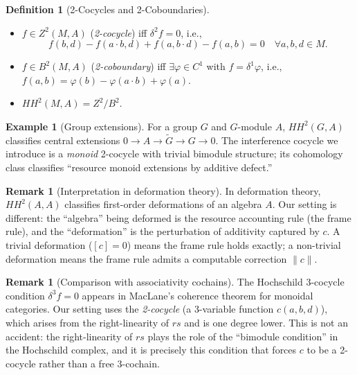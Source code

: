 \documentclass[acmsmall,sigplan,anonymous,review,screen]{acmart}
\theoremstyle{plain}
\theoremstyle{definition}
\newtheorem{definition}[theorem]{Definition}
\newtheorem{example}[theorem]{Example}
\newtheorem{remark}[theorem]{Remark}
\newcommand{\rs}{\mathit{rs}}
\newcommand{\HH}[2]{H\!H^{#1}(#2)}
\newcommand{\norm}[1]{\|#1\|}
\begin{document}
\begin{definition}[2-Cocycles and 2-Coboundaries]
\label{def:2cocycle}
  \begin{itemize}[itemsep=2pt]
    \item $f \in Z^2(M, A)$ (\emph{2-cocycle}) iff $\delta^2 f = 0$, i.e.,
      \[
        f(b, d) - f(a \cdot b, d) + f(a, b \cdot d) - f(a, b) = 0
        \quad \forall a, b, d \in M.
      \]
    \item $f \in B^2(M, A)$ (\emph{2-coboundary}) iff $\exists \varphi \in C^1$
      with $f = \delta^1 \varphi$, i.e., $f(a, b) = \varphi(b) - \varphi(a \cdot b) + \varphi(a)$.
    \item $\HH{2}{M, A} = Z^2 / B^2$.
  \end{itemize}
\end{definition}

\begin{example}[Group extensions]
  For a group $G$ and $G$-module $A$, $\HH{2}{G, A}$ classifies
  central extensions $0 \to A \to \tilde{G} \to G \to 0$.  The
  interference cocycle we introduce is a \emph{monoid} 2-cocycle with
  trivial bimodule structure; its cohomology class classifies
  ``resource monoid extensions by additive defect.''
\end{example}

\begin{remark}[Interpretation in deformation theory]
  In deformation theory, $\HH{2}{A, A}$ classifies first-order
  deformations of an algebra $A$.  Our setting is different: the
  ``algebra'' being deformed is the resource accounting rule (the frame
  rule), and the ``deformation'' is the perturbation of additivity
  captured by $c$.  A trivial deformation ($[c] = 0$) means the frame
  rule holds exactly; a non-trivial deformation means the frame rule
  admits a computable correction $\norm{c}$.
\end{remark}

\begin{remark}[Comparison with associativity cochains]
  The Hochschild 3-cocycle condition $\delta^3 f = 0$ appears in
  MacLane's coherence theorem for monoidal categories.  Our setting uses
  the \emph{2-cocycle} (a 3-variable function $c(a,b,d)$), which arises
  from the right-linearity of $\rs$ and is one degree lower.  This is
  not an accident: the right-linearity of $\rs$ plays the role of the
  ``bimodule condition'' in the Hochschild complex, and it is precisely
  this condition that forces $c$ to be a 2-cocycle rather than a free
  3-cochain.
\end{remark}
\end{document}
